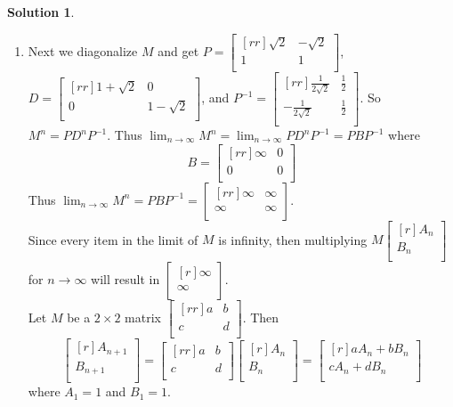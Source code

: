 \documentclass[12pt]{article}
\theoremstyle{definition}
\newtheorem*{solution}{Solution} %
\theoremstyle{plain}
\begin{document}
\begin{enumerate}
\begin{solution}
\begin{enumerate}
\item Next we diagonalize $M$ and get $P=\begin{bmatrix}[rr]\sqrt{2}&-\sqrt{2}\\1&1\\\end{bmatrix}$, $D=\begin{bmatrix}[rr]1+\sqrt{2}&0\\0&1-\sqrt{2}\\\end{bmatrix}$, and $P^{-1}=\begin{bmatrix}[rr]\frac{1}{2\sqrt{2}}&\frac{1}{2}\\-\frac{1}{2\sqrt{2}}&\frac{1}{2}\\\end{bmatrix}$. So $M^n=PD^nP^{-1}$. Thus $\lim_{n\rightarrow\infty}M^n=\lim_{n\rightarrow\infty}PD^nP^{-1}=PBP^{-1}$ where
\[ B=\begin{bmatrix}[rr]\infty &0\\0&0\\\end{bmatrix} \]
Thus $\lim_{n\rightarrow\infty}M^n = PBP^{-1}=\begin{bmatrix}[rr]\infty&\infty\\\infty&\infty\\\end{bmatrix}$.\\
Since every item in the limit of $M$ is infinity, then multiplying $M\begin{bmatrix}[r]A_n\\B_n\\\end{bmatrix}$ for $n\rightarrow\infty$ will result in $\begin{bmatrix}[r]\infty\\\infty\\\end{bmatrix}$.\\
Let $M$ be a $2\times2$ matrix $\begin{bmatrix}[rr]a&b\\c&d\\\end{bmatrix}$. Then
\[ \begin{bmatrix}[r]A_{n+1}\\B_{n+1}\\\end{bmatrix} = \begin{bmatrix}[rr]a&b\\c&d\\\end{bmatrix}\begin{bmatrix}[r]A_n\\B_n\\\end{bmatrix} = \begin{bmatrix}[r]aA_n+bB_n\\cA_n+dB_n\\\end{bmatrix} \]
where $A_1=1$ and $B_1=1$. 
\end{enumerate}
\end{solution}


\end{enumerate}
\end{document}
